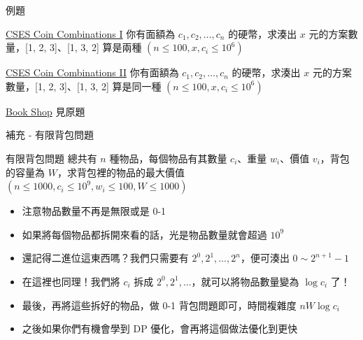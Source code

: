\documentclass[aspectratio=169]{beamer}
\begin{document}
    \begin{frame}{例題}
        \begin{block}{\href{https://cses.fi/problemset/task/1635}{CSES Coin Combinations I}}
            你有面額為 $c_1, c_2, \dots, c_n$ 的硬幣，求湊出 $x$ 元的方案數量，[1, 2, 3]、[1, 3, 2] 算是兩種 $(n \le 100, x, c_i \le 10^6)$
        \end{block}

        \begin{block}{\href{https://cses.fi/problemset/task/1636}{CSES Coin Combinations II}}
            你有面額為 $c_1, c_2, \dots, c_n$ 的硬幣，求湊出 $x$ 元的方案數量，[1, 2, 3]、[1, 3, 2] 算是同一種 $(n \le 100, x, c_i \le 10^6)$
        \end{block}

        \begin{block}{\href{https://cses.fi/problemset/task/1158}{Book Shop}}
            見原題
        \end{block}
    \end{frame}

    \begin{frame}{補充 - 有限背包問題}
        \begin{block}{有限背包問題}
            總共有 $n$ 種物品，每個物品有其數量 $c_i$、重量 $w_i$、價值 $v_i$，背包的容量為 $W$，求背包裡的物品的最大價值\\
            $(n \le 1000, c_i \le 10^9, w_i \le 100, W \le 1000)$
        \end{block}

        \begin{itemize}
            \item<1-> 注意物品數量不再是無限或是 0-1
            \item<2-> 如果將每個物品都拆開來看的話，光是物品數量就會超過 $10^9$
            \item<3-> 還記得二進位這東西嗎？我們只需要有 $2^0, 2^1, \dots, 2^n$，便可湊出 $0 \sim 2^{n + 1} - 1$
            \item<4-> 在這裡也同理！我們將 $c_i$ 拆成 $2^0, 2^1, \dots$，就可以將物品數量變為 $\log{c_i}$ 了！
            \item<5-> 最後，再將這些拆好的物品，做 0-1 背包問題即可，時間複雜度 $nW\log{c_i}$
            \item<6-> 之後如果你們有機會學到 DP 優化，會再將這個做法優化到更快
        \end{itemize}
    \end{frame}
\end{document}

